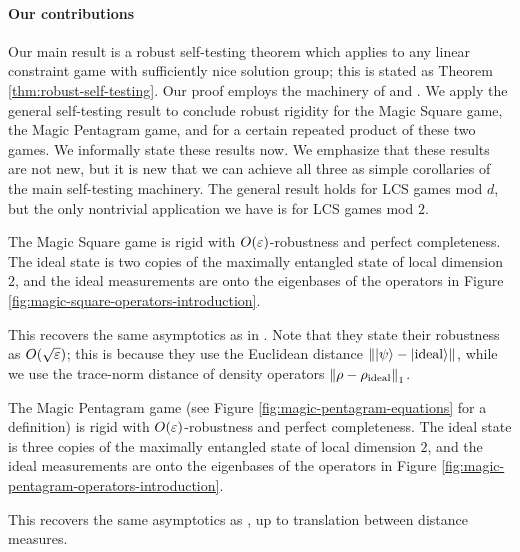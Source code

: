 
\paragraph{Our contributions}
Our main result is a robust self-testing theorem which applies to any linear constraint game with sufficiently nice solution group; this is stated as Theorem \ref{thm:robust-self-testing}. Our proof employs the machinery of \cite{cleve2016perfect} and \cite{slofstra2016tsirelson}. We apply the general self-testing result to conclude robust rigidity for the Magic Square game, the Magic Pentagram game, and for a certain repeated product of these two games. We informally state these results now. We emphasize that these results are not new, but it is new that we can achieve all three as simple corollaries of the main self-testing machinery. The general result holds for LCS games mod $d$, but the only nontrivial application we have is for LCS games mod $2$.

\begin{thm}\label{thm:informal-magic-square}
	The Magic Square game is rigid with $O(\varepsilon)$-robustness and perfect completeness. The ideal state is two copies of the maximally entangled state of local dimension $2$, and the ideal measurements are onto the eigenbases of the operators in Figure \ref{fig:magic-square-operators-introduction}.
\end{thm}
\noindent
This recovers the same asymptotics as in \cite{wu2016device}. Note that they state their robustness as $O(\sqrt{\varepsilon})$; this is because they use the Euclidean distance $\left\Vert\ket\psi - \ket{\text{ideal}}\right\Vert$, while we use the trace-norm distance of density operators $\left\Vert\rho - \rho_{\text{ideal}}\right\Vert_1$. 

\begin{thm}\label{thm:informal-magic-pentagram}
	The Magic Pentagram game (see Figure \ref{fig:magic-pentagram-equations} for a definition) is rigid with $O(\varepsilon)$-robustness and perfect completeness. The ideal state is three copies of the maximally entangled state of local dimension $2$, and the ideal measurements are onto the eigenbases of the operators in Figure \ref{fig:magic-pentagram-operators-introduction}.
\end{thm}
\noindent
This recovers the same asymptotics as \cite{kalev2017rigidity}, up to translation between distance measures.

